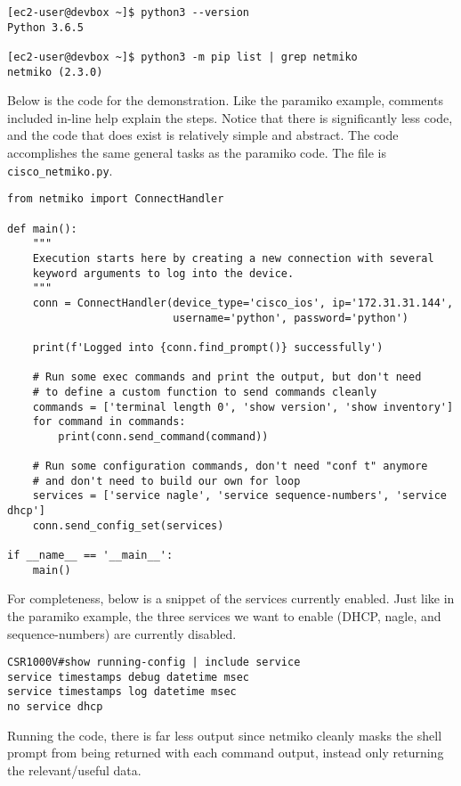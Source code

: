\begin{verbatim}
[ec2-user@devbox ~]$ python3 --version
Python 3.6.5

[ec2-user@devbox ~]$ python3 -m pip list | grep netmiko
netmiko (2.3.0)
\end{verbatim}

Below is the code for the demonstration. Like the paramiko example, comments
included in-line help explain the steps. Notice that there is significantly
less code, and the code that does exist is relatively simple and abstract. The
code accomplishes the same general tasks as the paramiko code. The file is
\verb|cisco_netmiko.py|.

\begin{verbatim}
from netmiko import ConnectHandler

def main():
    """
    Execution starts here by creating a new connection with several
    keyword arguments to log into the device.
    """
    conn = ConnectHandler(device_type='cisco_ios', ip='172.31.31.144',
                          username='python', password='python')

    print(f'Logged into {conn.find_prompt()} successfully')

    # Run some exec commands and print the output, but don't need
    # to define a custom function to send commands cleanly
    commands = ['terminal length 0', 'show version', 'show inventory']
    for command in commands:
        print(conn.send_command(command))

    # Run some configuration commands, don't need "conf t" anymore
    # and don't need to build our own for loop
    services = ['service nagle', 'service sequence-numbers', 'service dhcp']
    conn.send_config_set(services)

if __name__ == '__main__':
    main()
\end{verbatim}

For completeness, below is a snippet of the services currently enabled. Just
like in the paramiko example, the three services we want to enable (DHCP,
nagle, and sequence-numbers) are currently disabled.

\begin{verbatim}
CSR1000V#show running-config | include service
service timestamps debug datetime msec
service timestamps log datetime msec
no service dhcp
\end{verbatim}

Running the code, there is far less output since netmiko cleanly masks the
shell prompt from being returned with each command output, instead only
returning the relevant/useful data.

